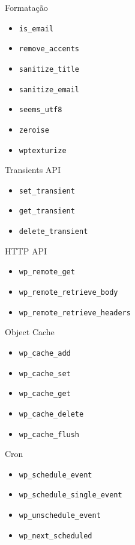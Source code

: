 \documentclass{beamer}
\begin{document}
\begin{frame}{Formatação}
\begin{itemize}
  \pause \item \texttt{is\_email}
  \pause \item \texttt{remove\_accents}
  \pause \item \texttt{sanitize\_title}
  \pause \item \texttt{sanitize\_email}
  \pause \item \texttt{seems\_utf8}
  \pause \item \texttt{zeroise}
  \pause \item \texttt{wptexturize}
\end{itemize}
\end{frame}

\begin{frame}{Transients API}
\begin{itemize}
  \pause \item \texttt{set\_transient}
  \pause \item \texttt{get\_transient}
  \pause \item \texttt{delete\_transient}
\end{itemize}
\end{frame}

\begin{frame}{HTTP API}
\begin{itemize}
  \pause \item \texttt{wp\_remote\_get}
  \pause \item \texttt{wp\_remote\_retrieve\_body}
  \pause \item \texttt{wp\_remote\_retrieve\_headers}
\end{itemize}
\end{frame}

\begin{frame}{Object Cache}
\begin{itemize}
  \pause \item \texttt{wp\_cache\_add}
  \pause \item \texttt{wp\_cache\_set}
  \pause \item \texttt{wp\_cache\_get}
  \pause \item \texttt{wp\_cache\_delete}
  \pause \item \texttt{wp\_cache\_flush}
\end{itemize}
\end{frame}

\begin{frame}{Cron}
\begin{itemize}
  \pause \item \texttt{wp\_schedule\_event}
  \pause \item \texttt{wp\_schedule\_single\_event}
  \pause \item \texttt{wp\_unschedule\_event}
  \pause \item \texttt{wp\_next\_scheduled}
\end{itemize}
\end{frame}
\end{document}

